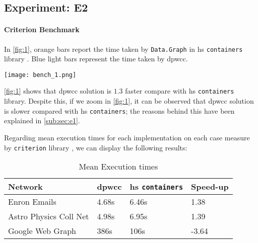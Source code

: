   \subsection{Experiment: E2}
  \paragraph{Criterion Benchmark}
  In \autoref{fig:1}, orange bars report the time taken by \texttt{Data.Graph} in \acrshort{hs} \texttt{containers} library \cite{containers}. Blue light bars represent the time taken by \acrshort{dpwcc}.
  
  \begin{minipage}[t]{\linewidth}
    \texttt{[image: bench\_1.png]}
    \captionsetup{type=figure}
    \label{fig:1}
  \end{minipage}
  
  \autoref{fig:1} shows that \acrshort{dpwcc} solution is $1.3$ faster compare with \acrshort{hs} \texttt{containers} library. Despite this, if we zoom  in \autoref{fig:1}, it can be observed that \acrshort{dpwcc} solution is slower compared with \acrshort{hs} \texttt{containers}; the reasons behind this have been explained in \autoref{sub:sec:e1}.
  \iffalse
  \begin{minipage}[t]{\linewidth}
    \texttt{[image: bench\_2]}
    \captionsetup{type=figure}
    \captionof{figure}{Benchmark 2 - DP in Haskell vs. Data.Graph Haskell}
    \label{fig:2}
  \end{minipage}
  \fi
  
  Regarding mean execution times for each implementation on each case measure by \texttt{criterion} library \cite{criterion}, we can display the following results:
  
  \begin{table}[H]
    \centering
    \begin{tabular}{|l|l|l|l|}
     \hline
     \textbf{Network} & \textbf{\acrshort{dpwcc}} & \textbf{\acrshort{hs} \texttt{containers}} & \textbf{Speed-up}\\
     \hline
     Enron Emails & 4.68s &  6.46s & 1.38\\
     \hline
     Astro Physics Coll Net & 4.98s & 6.95s  & 1.39\\
     \hline
     Google Web Graph & 386s & 106s & -3.64\\
     \hline
    \end{tabular}
   \caption{Mean Execution times}
   \label{table:6}
   \end{table}
  
